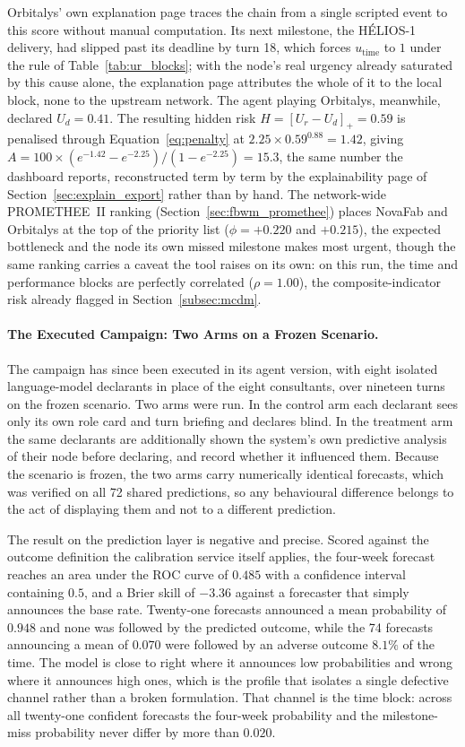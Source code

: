 Orbitalys' own explanation page traces the chain from a single scripted event to this score without manual computation. Its next milestone, the HÉLIOS-1 delivery, had slipped past its deadline by turn 18, which forces $u_{\text{time}}$ to $1$ under the rule of Table~\ref{tab:ur_blocks}; with the node's real urgency already saturated by this cause alone, the explanation page attributes the whole of it to the local block, none to the upstream network. The agent playing Orbitalys, meanwhile, declared $U_d=0.41$. The resulting hidden risk $H=[U_r-U_d]_+=0.59$ is penalised through Equation~\ref{eq:penalty} at $2.25\times0.59^{0.88}=1.42$, giving $A=100\times(e^{-1.42}-e^{-2.25})/(1-e^{-2.25})=15.3$, the same number the dashboard reports, reconstructed term by term by the explainability page of Section~\ref{sec:explain_export} rather than by hand. The network-wide PROMETHEE~II ranking (Section~\ref{sec:fbwm_promethee}) places NovaFab and Orbitalys at the top of the priority list ($\phi=+0.220$ and $+0.215$), the expected bottleneck and the node its own missed milestone makes most urgent, though the same ranking carries a caveat the tool raises on its own: on this run, the time and performance blocks are perfectly correlated ($\rho=1.00$), the composite-indicator risk already flagged in Section~\ref{subsec:mcdm}.

\paragraph{The Executed Campaign: Two Arms on a Frozen Scenario.}
The campaign has since been executed in its agent version, with eight isolated language-model declarants in place of the eight consultants, over nineteen turns on the frozen scenario. Two arms were run. In the control arm each declarant sees only its own role card and turn briefing and declares blind. In the treatment arm the same declarants are additionally shown the system's own predictive analysis of their node before declaring, and record whether it influenced them. Because the scenario is frozen, the two arms carry numerically identical forecasts, which was verified on all 72 shared predictions, so any behavioural difference belongs to the act of displaying them and not to a different prediction.

The result on the prediction layer is negative and precise. Scored against the outcome definition the calibration service itself applies, the four-week forecast reaches an area under the ROC curve of $0.485$ with a confidence interval containing $0.5$, and a Brier skill of $-3.36$ against a forecaster that simply announces the base rate. Twenty-one forecasts announced a mean probability of $0.948$ and none was followed by the predicted outcome, while the 74 forecasts announcing a mean of $0.070$ were followed by an adverse outcome $8.1\%$ of the time. The model is close to right where it announces low probabilities and wrong where it announces high ones, which is the profile that isolates a single defective channel rather than a broken formulation. That channel is the time block: across all twenty-one confident forecasts the four-week probability and the milestone-miss probability never differ by more than $0.020$.

